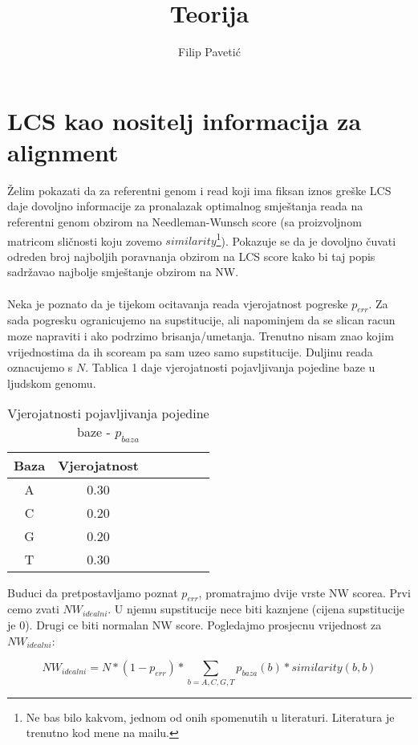 \documentclass[11pt]{article} %
\title{Teorija}
\author{Filip Paveti\'{c}}
\begin{document}
\maketitle

\section{LCS kao nositelj informacija za alignment}

\v{Z}elim pokazati da za referentni genom i read koji ima fiksan iznos gre\v{s}ke LCS  daje dovoljno informacije za pronalazak optimalnog smje\v{s}tanja reada na referentni genom obzirom na Needleman-Wunsch score (sa proizvoljnom matricom sli\v{c}nosti koju zovemo $similarity$\footnote{Ne bas bilo kakvom, jednom od onih spomenutih u literaturi. Literatura je trenutno kod mene na mailu.}). Pokazuje se da je dovoljno \v{c}uvati odreden broj najboljih poravnanja obzirom na LCS score kako bi taj popis sadr\v{z}avao najbolje smje\v{s}tanje obzirom na NW.\\
\\
Neka je poznato da je tijekom ocitavanja reada vjerojatnost pogreske $p_{err}$. Za sada pogresku ogranicujemo na supstitucije, ali napominjem da se slican racun moze napraviti i ako podrzimo brisanja/umetanja. Trenutno nisam znao kojim vrijednostima da ih scoream pa sam uzeo samo supstitucije. Duljinu reada oznacujemo s $N$. Tablica 1 daje vjerojatnosti pojavljivanja pojedine baze u ljudskom genomu.\\

\begin{table}[H]
\centering
\begin{tabular}{|c||c|c|c|c|c|c|}
\hline
	Baza & Vjerojatnost\\
\hline
\hline
	A & 0.30\\
\hline
	C & 0.20\\
\hline
	G & 0.20\\
\hline
	T & 0.30\\
\hline
\end{tabular}
\caption{Vjerojatnosti pojavljivanja pojedine baze - $p_{baza}$}
\end{table}

Buduci da pretpostavljamo poznat $p_{err}$, promatrajmo dvije vrste NW scorea. Prvi cemo zvati $NW_{idealni}$. U njemu supstitucije nece biti kaznjene (cijena supstitucije je 0). Drugi ce biti normalan NW score. Pogledajmo prosjecnu vrijednost za $NW_{idealni}$:

\begin{equation}
	NW_{idealni} = N * (1-p_{err}) * \sum\limits_{b=A,C,G,T} p_{baza}(b) * similarity(b,b)
\end{equation}
\end{document}
